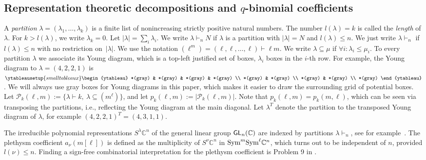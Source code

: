 \documentclass[a4paper]{extarticle}
\newcommand{\IC}{\mathbb{C}}
\newcommand{\GL}{\textsf{\textup{GL}}}
\newcommand{\Sym}{\textup{Sym}}
\newcommand{\la}{\lambda}
\numberwithin{theorem}{section}
\theoremstyle{definition}
\begin{document}
\subsection{Representation theoretic decompositions and \texorpdfstring{$q$}{q}-binomial coefficients}
A \emph{partition} $\la=(\la_1,\ldots,\la_k)$ is a finite list of nonincreasing strictly positive natural numbers.
The number $l(\la)=k$ is called the \emph{length} of $\la$. For $k>l(\la)$, we write $\la_k=0$.
Let $|\la|=\sum_i\la_i$.
We write $\la\vdash_n N$ if $\la$ is a partition with $|\la|=N$ and $l(\la)\leq n$.
We just write $\la\vdash_n$ if $l(\la)\leq n$ with no restriction on~$|\la|$.
We use the notation $(\ell^m)=(\ell,\ell,\ldots,\ell) \vdash \ell m$.
We write $\la\subseteq\mu$ if $\forall i: \la_i\leq \mu_i$.
To every partition $\la$ we associate its Young diagram, which is a top-left justified set of boxes, $\la_i$ boxes in the $i$-th row.
For example, the Young diagram to $\la=(4,2,2,1)$ is
$\ytableausetup{smalltableaux}
\begin{ytableau}
 *(gray) & *(gray) & *(gray) & *(gray) \\
 *(gray) & *(gray) \\
 *(gray) & *(gray) \\
 *(gray)
\end{ytableau}$.
We will always use gray boxes for Young diagrams in this paper, which makes it easier to draw the surrounding grid of potential boxes.
Let $\mathscr P_k(\ell,m) := \{\la \vdash k, \ \la\subseteq (m^\ell)\}$, and let $p_k(\ell,m) := |\mathscr P_k(\ell,m)|$.
Note that $p_k(\ell,m)=p_k(m,\ell)$, which can be seen via transposing the partitions, i.e., reflecting the Young diagram at the main diagonal.
Let $\la^T$ denote the partition to the transposed Young diagram of $\la$, for example $(4,2,2,1)^T=(4,3,1,1)$.

The irreducible polynomial representations $S^\la\IC^n$ of the general linear group $\GL_n(\IC)$ are indexed by partitions $\la\vdash_n$,
 see for example~\cite{FH:13}.
The plethysm coefficient $a_\nu(m[\ell])$ is defined as the multiplicity of $S^\nu\IC^n$ in $\Sym^m \Sym^\ell \IC^n$, which turns out to be independent of $n$, provided $l(\nu)\leq n$.
Finding a sign-free combinatorial interpretation for the plethysm coefficient is Problem 9 in \cite{Sta:00}.
\end{document}
